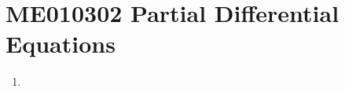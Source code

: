 
\chapter{ME010302 Partial Differential Equations}
\begin{enumerate}[label=Week \arabic*]
	\item 
\end{enumerate}

